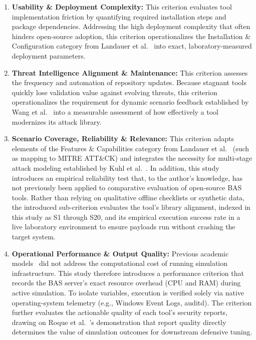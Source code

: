 \begin{enumerate}
    \item \textbf{Usability \& Deployment Complexity:} This criterion evaluates tool implementation friction by quantifying required installation steps and package dependencies. Addressing the high deployment complexity that often hinders open-source adoption, this criterion operationalizes the Installation \& Configuration category from Landauer et al.~\cite{landauer2024} into exact, laboratory-measured deployment parameters.

    \item \textbf{Threat Intelligence Alignment \& Maintenance:} This criterion assesses the frequency and automation of repository updates. Because stagnant tools quickly lose validation value against evolving threats, this criterion operationalizes the requirement for dynamic scenario feedback established by Wang et al.~\cite{wang2025} into a measurable assessment of how effectively a tool modernizes its attack library.

    \item \textbf{Scenario Coverage, Reliability \& Relevance:} This criterion adapts elements of the Features \& Capabilities category from Landauer et al.~\cite{landauer2024} (such as mapping to MITRE ATT\&CK) and integrates the necessity for multi-stage attack modeling established by Kuhl et al.~\cite{kuhl2007}. In addition, this study introduces an empirical reliability test that, to the author's knowledge, has not previously been applied to comparative evaluation of open-source BAS tools. Rather than relying on qualitative offline checklists or synthetic data, the introduced sub-criterion evaluates the tool's library alignment, indexed in this study as S1 through S20, and its empirical execution success rate in a live laboratory environment to ensure payloads run without crashing the target system.

    \item \textbf{Operational Performance \& Output Quality:} Previous academic models~\cite{wang2025,kuhl2007} did not address the computational cost of running simulation infrastructure. This study therefore introduces a performance criterion that records the BAS server's exact resource overhead (CPU and RAM) during active simulation. To isolate variables, execution is verified solely via native operating-system telemetry (e.g., Windows Event Logs, auditd). The criterion further evaluates the actionable quality of each tool's security reports, drawing on Roque et al.~\cite{roque2024}'s demonstration that report quality directly determines the value of simulation outcomes for downstream defensive tuning.


\end{enumerate}
